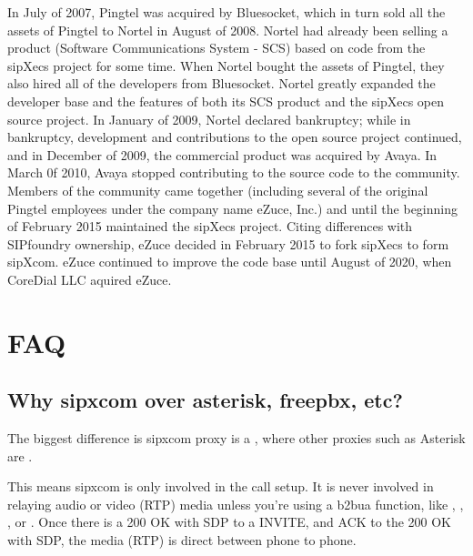 \documentclass[letterpaper,10pt,english]{sphinxmanual}
\begin{document}
In July of 2007, Pingtel was acquired by Bluesocket, which in turn sold all the assets of Pingtel to Nortel in August of 2008. Nortel had already been selling a product (Software Communications System - SCS) based on code from the sipXecs project for some time. When Nortel bought the assets of Pingtel, they also hired all of the developers from Bluesocket. Nortel greatly expanded the developer base and the features of both its SCS product and the sipXecs open source project. In January of 2009, Nortel declared bankruptcy; while in bankruptcy, development and contributions to the open source project continued, and in December of 2009, the commercial product was acquired by Avaya. In March 0f 2010, Avaya stopped contributing to the source code to the community. Members of the community came together (including several of the original Pingtel employees under the company name eZuce, Inc.) and until the beginning of February 2015 maintained the sipXecs project. Citing differences with SIPfoundry ownership, eZuce decided in February 2015 to fork sipXecs to form sipXcom.  eZuce continued to improve the code base until August of 2020, when CoreDial LLC aquired eZuce.


\chapter{FAQ}
\label{\detokenize{faq:faq}}\label{\detokenize{faq::doc}}

\section{Why sipxcom over asterisk, freepbx, etc?}
\label{\detokenize{faq:why-sipxcom-over-asterisk-freepbx-etc}}
The biggest difference is sipxcom proxy is a , where other proxies such as Asterisk are .

This means sipxcom is only involved in the call setup. It is never involved in relaying audio or video (RTP) media unless you’re using a b2bua function, like {\hyperref[\detokenize{webui:conferencing}]{}} , {\hyperref[\detokenize{webui:voicemail}]{}}, {\hyperref[\detokenize{webui:auto-attendants}]{}}, or {\hyperref[\detokenize{webui:call-queue}]{}}.
Once there is a 200 OK with SDP to a INVITE, and ACK to the 200 OK with SDP, the media (RTP) is direct between phone to phone.
\end{document}
